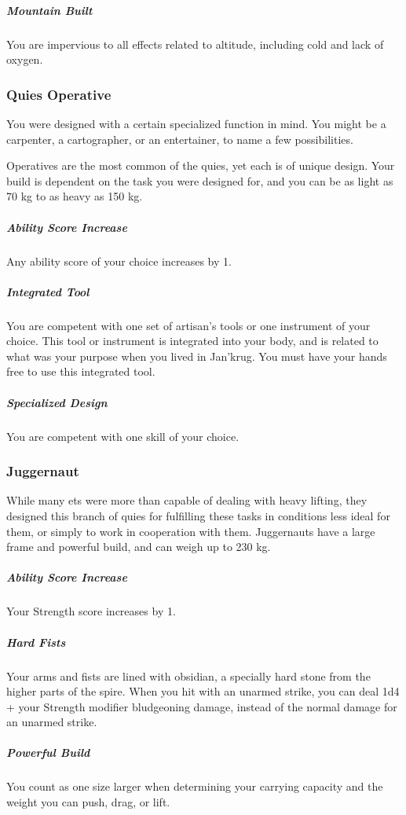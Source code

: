 \begin{linenumbers}

\subparagraph{Mountain Built} You are impervious to all effects related to altitude, including cold and lack of oxygen.

\subsubsection{Quies Operative}
You were designed with a certain specialized function in mind.
You might be a carpenter, a cartographer, or an entertainer, to name a few possibilities.

Operatives are the most common of the quies, yet each is of unique design.
Your build is dependent on the task you were designed for, and you can be as light as 70 kg to as heavy as 150 kg.

\subparagraph{Ability Score Increase} Any ability score of your choice increases by 1.

\subparagraph{Integrated Tool} You are competent with one set of artisan's tools or one instrument of your choice.
This tool or instrument is integrated into your body, and is related to what was your purpose when you lived in Jan'krug.
You must have your hands free to use this integrated tool.

\subparagraph{Specialized Design} You are competent with one skill of your choice.

\subsubsection{Juggernaut}
While many ets were more than capable of dealing with heavy lifting, they designed this branch of quies for fulfilling these tasks in conditions less ideal for them, or simply to work in cooperation with them.
Juggernauts have a large frame and powerful build, and can weigh up to 230 kg.

\subparagraph{Ability Score Increase} Your Strength score increases by 1.

\subparagraph{Hard Fists} Your arms and fists are lined with obsidian, a specially hard stone from the higher parts of the spire.
When you hit with an unarmed strike, you can deal 1d4 + your Strength modifier bludgeoning damage, instead of the normal damage for an unarmed strike.

\subparagraph{Powerful Build} You count as one size larger when determining your carrying capacity and the weight you can push, drag, or lift.


\end{linenumbers}
